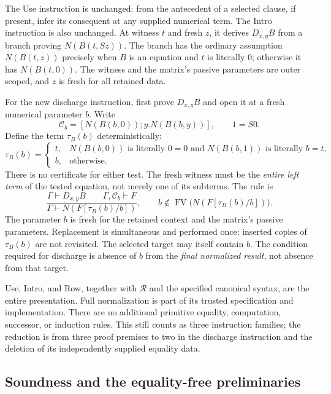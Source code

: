 \documentclass[11pt,letterpaper]{article}
\theoremstyle{definition}\newtheorem{definition}[theorem]{Definition}
\theoremstyle{remark}\newtheorem{remark}[theorem]{Remark}
\begin{document}
The Use instruction is unchanged: from the antecedent of a selected
clause, if present, infer its consequent at any supplied numerical term.
The Intro instruction is also unchanged.  At witness $t$ and fresh $z$,
it derives $D_{x,y}B$ from a branch proving $N(B(t,Sz))$.  The branch has
the ordinary assumption $N(B(t,z))$ precisely when $B$ is an equation and
$t$ is literally $0$; otherwise it has $N(B(t,0))$.  The witness and the
matrix's passive parameters are outer scoped, and $z$ is fresh for all
retained data.

For the new discharge instruction, first prove $D_{x,y}B$ and open it at
a fresh numerical parameter $b$.  Write
\[
 \mathcal C_b=[N(B(b,0));y.N(B(b,y))],\qquad 1=S0.
\]
Define the term $\tau_B(b)$ deterministically:
\begin{equation}
 \tau_B(b)=
 \begin{cases}
 t,&N(B(b,0))\text{ is literally }0=0
       \text{ and }N(B(b,1))\text{ is literally }b=t,\\
 b,&\text{otherwise}.
 \end{cases}
 \label{eq:row-target}
\end{equation}
There is no certificate for either test.  The fresh witness must be the
\emph{entire left term} of the tested equation, not merely one of its
subterms.  The rule is
\begin{equation}
 \frac{\Gamma\vdash D_{x,y}B\qquad
       \Gamma,\mathcal C_b\vdash F}
      {\Gamma\vdash N(F[\tau_B(b)/b])},
 \qquad b\notin\operatorname{FV}\bigl(N(F[\tau_B(b)/b])\bigr).
 \tag{Row}
 \label{rule:first-row}
\end{equation}
The parameter $b$ is fresh for the retained context and the matrix's
passive parameters.  Replacement is simultaneous and performed once:
inserted copies of $\tau_B(b)$ are not revisited.  The selected target may
itself contain $b$.  The condition required for discharge is absence of
$b$ from the \emph{final normalized result}, not absence from that target.

Use, Intro, and Row, together with $\mathcal R$ and the specified canonical
syntax, are the entire presentation.  Full normalization is part of its
trusted specification and implementation.  There are no additional
primitive equality, computation, successor, or induction rules.  This
still counts as three instruction families; the reduction is from three
proof premises to two in the discharge instruction and the deletion of
its independently supplied equality data.

\subsection{Soundness and the equality-free preliminaries}
\end{document}
